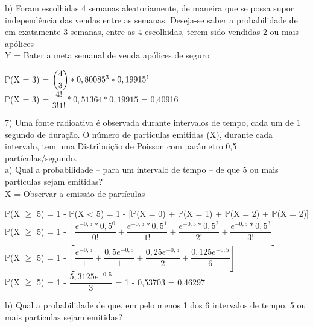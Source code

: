 \documentclass[12pt,a4paper]{article}
\begin{document}
	\vspace{1cm}
	b) Foram escolhidas 4 semanas aleatoriamente, de maneira que se possa
	supor independência das vendas entre as semanas. Deseja-se saber a
	probabilidade de em exatamente 3 semanas, entre as 4 escolhidas, terem
	sido vendidas 2 ou mais apólices
	\vspace{0.5cm}\\
	Y = Bater a meta semanal de venda apólices de seguro
	\begin{center}
		\vspace{0.5cm}
		$\mathbb{P}$(X = 3) = $\dbinom{4}{3} * 0,80085^{3} * 0,19915^{1}$ 
		\vspace{0.5cm}\\
		$\mathbb{P}$(X = 3) = $\dfrac{4!}{3!1!} * 0,51364 * 0,19915$ = 0,40916
	\end{center}
	\vspace{1cm}
	7) Uma fonte radioativa é observada durante intervalos de tempo, cada um de 1 segundo de duração. O número de partículas emitidas (X), durante cada intervalo, tem uma Distribuição de Poisson com parâmetro
	0,5 partículas/segundo.\\
	a) Qual a probabilidade – para um intervalo de tempo – de que 5 ou mais partículas sejam emitidas?
	\vspace{0.5cm}\\
	X = Observar a emissão de partículas
	\begin{center}
		\vspace{0.5cm}
		$\mathbb{P}$(X $\geq$ 5) = 1 - $\mathbb{P}$(X < 5) = 1 - [$\mathbb{P}$(X = 0) + $\mathbb{P}$(X = 1) + $\mathbb{P}$(X = 2) + $\mathbb{P}$(X = 2)]
		\vspace{0.5cm}\\
		$\mathbb{P}$(X $\geq$ 5) = 1 - $\left[\dfrac{e^{-0,5} * 0,5^0}{0!} + \dfrac{e^{-0,5} * 0,5^1}{1!} + \dfrac{e^{-0,5} * 0,5^2}{2!} + \dfrac{e^{-0,5} * 0,5^3}{3!}\right]$
		\vspace{0.5cm}\\
		$\mathbb{P}$(X $\geq$ 5) = 1 - $\left[\dfrac{e^{-0,5}}{1} + \dfrac{0,5e^{-0,5}}{1} + \dfrac{0,25e^{-0,5}}{2} + \dfrac{0,125e^{-0,5}}{6}\right]$
		\vspace{0.5cm}\\
		$\mathbb{P}$(X $\geq$ 5) = 1 - $\dfrac{5,3125e^{-0,5}}{3}$ = 1 - 0,53703 = 0,46297
	\end{center}
	\vspace{1cm}
	b) Qual a probabilidade de que, em pelo menos 1 dos 6 intervalos de
	tempo, 5 ou mais partículas sejam emitidas?
\end{document}
